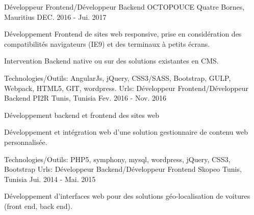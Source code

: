 \begin{cventries}
  \techentries
    {Développeur Frontend/Développeur Backend}
    {OCTOPOUCE}
    {Quatre Bornes, Mauritius}
    {DEC. 2016 - Jui. 2017}
    {
      \begin{cvitems}
		\item {Développement Frontend de sites web responsive, prise en considération des compatibilités navigateurs (IE9) et des terminaux à petits écrans.}		
		\item {Intervention Backend native ou sur des solutions existantes en CMS.}
      \end{cvitems}
    }
    {\textcolor{awesome}{Technologies/Outils: } {\color{graytext}}  {AngularJs, jQuery, CSS3/SASS, Bootstrap, GULP, Webpack, HTML5, GIT, wordpress.}}
    {Urls:} 
    { \href{http://www.helloagency.com/}{} \break
     \href{http://anahita.mu/}{} \break
     \href{http://publicis-dashboard.octopouce.mu/en/}{}\break
    }
  \techentries
    {Développeur Frontend/Développeur Backend}
    {PI2R}
    {Tunis, Tunisia}
    {Fev. 2016 - Nov. 2016}
    {
      \begin{cvitems}
        \item {Développement backend et frontend des sites web }
        \item {Développement et intégration web d'une solution gestionnaire de contenu web personnalisée. }
      \end{cvitems}
    }
    {\textcolor{awesome}{Technologies/Outils: } {\color{graytext}}  {PHP5, symphony, mysql, wordpress, jQuery, CSS3, Bootstrap}}
    {Urls:} 
    {\href{http://www.ozeol.com/en/}{} \break
    \href{http://www.milddream.com/fr/ }{} \break
    }    
  \techentries
    {Développeur Backend/Développeur Frontend}
    {Skopeo}
    {Tunis, Tunisia}
    {Jui. 2014 - Mai. 2015}
    {
      \begin{cvitems}
        \item {Développement d'interfaces web pour des solutions géo-localisation de voitures (front end, back end).}

\end{cvitems}}
\end{cventries}
